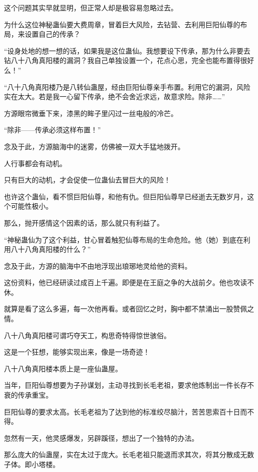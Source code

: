 
\begin{this_body}



这个问题其实早就显明，但正常人却是极容易忽略过去。

为什么这位神秘蛊仙要大费周章，冒着巨大风险，去钻营、去利用巨阳仙尊的布局，来设置自己的传承？

“设身处地的想一想的话，如果我是这位蛊仙。我想要设下传承，那为什么非要去钻八十八角真阳楼的漏洞？我自己单独设置一个，花点心思，完全也能布置得很好么！”

“八十八角真阳楼乃是八转仙蛊屋，经由巨阳仙尊亲手布置。利用它的漏洞，风险实在太大。若是我一心留下传承，绝不会舍近求远，故意求险。除非……”

方源眼帘微垂下来，漆黑的眸子里闪过一丝电般的冷芒。

“除非——传承必须这样布置！”

念及于此，方源脑海中的迷雾，仿佛被一双大手猛地拨开。

人行事都会有动机。

只有巨大的动机，才会促使一位蛊仙去冒巨大的风险！

也许这个蛊仙，看不惯巨阳仙尊，和他有仇。但巨阳仙尊早已经逝去无数岁月，这个可能性极小。

那么，抛开感情这个因素的话，那么就只有利益了。

“神秘蛊仙为了这个利益，甘心冒着触犯仙尊布局的生命危险。他（她）到底在利用八十八角真阳楼的什么？”

念及于此，方源的脑海中不由地浮现出琅琊地灵给他的资料。

这份资料，他已经研读过成百上千遍。即便是在王庭之争的大战前夕。他也攻读不休。

就算是看了这么多遍，每一次他再看。或者回忆之时，胸中都不禁涌出一股赞佩之情。

八十八角真阳楼可谓巧夺天工，构思奇特得惊世骇俗。

这是一个狂想，能够实现出来，像是一场奇迹！

八十八角真阳楼本质上是一座仙蛊屋。

当年，巨阳仙尊想要为子孙谋划，主动寻找到长毛老祖，要求他炼制出一件长存不衰的传承重宝。

巨阳仙尊的要求太高。长毛老祖为了达到他的标准绞尽脑汁，苦苦思索百十日而不得。

忽然有一天，他灵感爆发，另辟蹊径，想出了一个独特的办法。

那么庞大的仙蛊屋，实在太过于庞大。长毛老祖只能退而求其次，将其分散成无数子体。即小塔楼。


\end{this_body}
